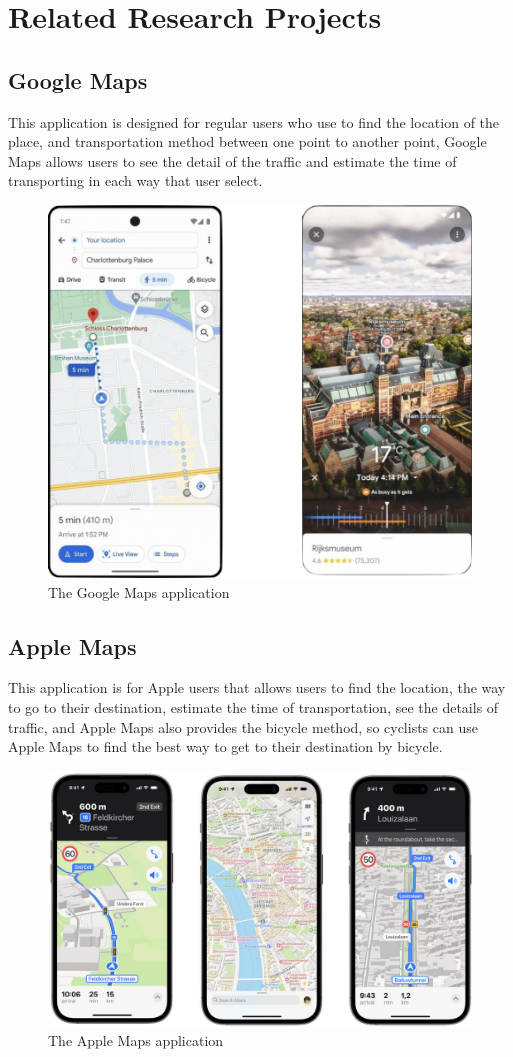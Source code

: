 \newpage
\section{Related Research Projects}
\subsection{Google Maps}
This application is designed for regular users who use to find the location of the place, and transportation method between one point to another point, Google Maps allows users to see the detail of the traffic and estimate the time of transporting in each way that user select.
\begin{figure}[!h]
    \centering
    \includegraphics[width=0.5\linewidth]{chapter2/google_map.png}
    \caption{The Google Maps application}
    \label{fig:The Google Maps application}
\end{figure}

\subsection{Apple Maps}
This application is for Apple users that allows users to find the location, the way to go to their destination, estimate the time of transportation, see the details of traffic, and Apple Maps also provides the bicycle method, so cyclists can use Apple Maps to find the best way to get to their destination by bicycle.
\begin{figure}[!h]
    \centering
    \includegraphics[width=0.5\linewidth]{chapter2/apple_map.png}
    \caption{The Apple Maps application}
    \label{fig:The Apple Maps application}
\end{figure}

